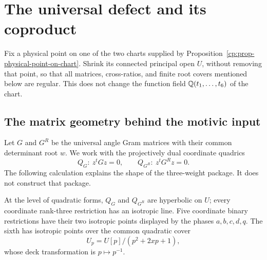\section{The universal defect and its coproduct}
\label{cp:sec-relative-rigidity}

Fix a physical point on one of the two charts supplied by
Proposition~\ref{cp:prop-physical-point-on-chart}.  Shrink its connected
principal open \(U\), without removing that point, so that all matrices,
cross-ratios, and finite root covers mentioned below are regular.  This
does not change the function field
\(\mathbb Q(t_1,\ldots,t_6)\) of the chart.

\subsection{The matrix geometry behind the motivic input}

Let \(G\) and \(G^R\) be the universal angle Gram matrices with their common
determinant root \(w\).  We work with the projectively dual coordinate
quadrics
\[
 Q_G:\ z^tGz=0,\qquad Q_{G^R}:\ z^tG^Rz=0.
\]
The following calculation explains the shape of the three-weight package.
It does not construct that package.

\begin{lemma}
\label{cp:lem-split-strata}
At the level of quadratic forms, \(Q_G\) and \(Q_{G^R}\) are hyperbolic on
\(U\); every coordinate rank-three restriction has an isotropic line.  Five
coordinate binary restrictions have their two isotropic points displayed by
the phases \(a,b,c,d,q\).  The sixth has isotropic points over the common
quadratic cover
\[
 U_p=U[p]/(p^2+2xp+1),
\]
whose deck transformation is \(p\mapsto p^{-1}\).
\end{lemma}

